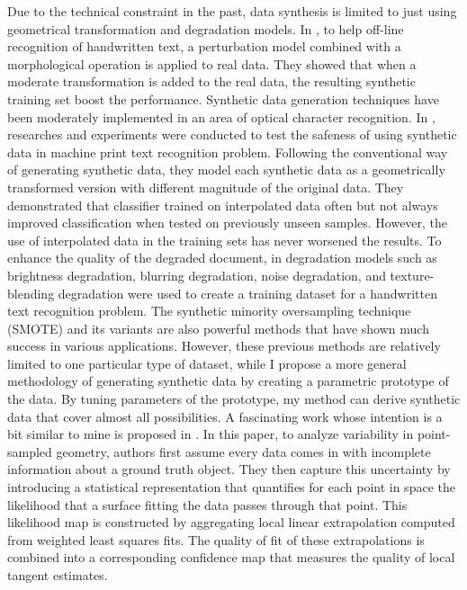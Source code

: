\documentclass{iitthesis}
\begin{document}
Due to the technical constraint in the past, data synthesis is limited to just using geometrical transformation and degradation models. In \cite{VT:03}\cite{VT:04}, to help off-line recognition of handwritten text, a perturbation model combined with a morphological operation is applied to real data. They showed that when a moderate transformation is added to the real data, the resulting synthetic training set boost the performance. Synthetic data generation techniques have been moderately implemented in an area of optical character recognition. In \cite{NJ:09}, researches and experiments were conducted to test the safeness of using synthetic data in machine print text recognition problem. Following the conventional way of generating synthetic data, they model each synthetic data as a geometrically transformed version with different magnitude of the original data. They demonstrated that classifier trained on interpolated data often but not always improved classification when tested on previously unseen samples. However, the use of interpolated data in the training sets has never worsened the results. To enhance the quality of the degraded document, in \cite{BG:08} degradation models such as brightness degradation, blurring degradation, noise degradation, and texture-blending degradation were used to create a training dataset for a handwritten text recognition problem. The synthetic minority oversampling technique (SMOTE) \cite{CNV:02} and its variants \cite{HH:05}\cite{HH:08} are also powerful methods that have shown much success in various applications.  However, these previous methods are relatively limited to one particular type of dataset, while  I propose a more general  methodology of generating synthetic data by creating a parametric prototype of the data. By tuning parameters of the prototype, my method can derive synthetic data that cover almost all possibilities. A fascinating work whose intention is a bit similar to mine is proposed in \cite{Pauly:2004:UVP:2386332.2386346}. In this paper, to analyze variability in point-sampled geometry, authors first assume every data comes in with incomplete information about a ground truth object. They then capture this uncertainty by introducing a statistical representation that quantifies for each point in space the likelihood that a surface fitting the data passes through that point. This likelihood map is constructed by aggregating local linear extrapolation computed from weighted least squares fits. The quality of fit of these extrapolations is combined into a corresponding confidence map that measures the quality of local tangent estimates.
\end{document}
